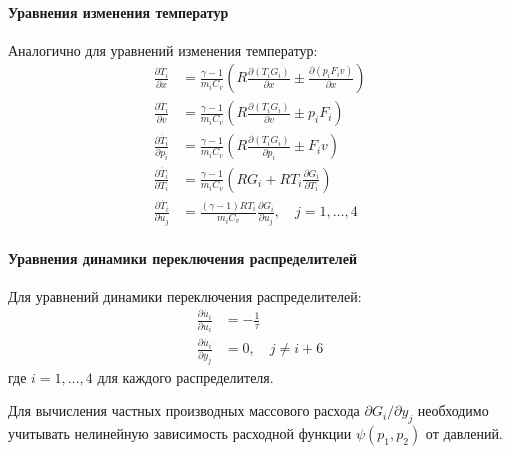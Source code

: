 \paragraph{Уравнения изменения температур}
Аналогично для уравнений изменения температур:
\begin{equation}\label{eq:ch2/jacobian_temperature}
    \begin{aligned}
        \frac{\partial \dot{T_i}}{\partial x}   & = \frac{\gamma-1}{m_iC_v}\left(R\frac{\partial (T_iG_i)}{\partial x} \pm \frac{\partial (p_iF_iv)}{\partial x}\right) \\
        \frac{\partial \dot{T_i}}{\partial v}   & = \frac{\gamma-1}{m_iC_v}\left(R\frac{\partial (T_iG_i)}{\partial v} \pm p_iF_i\right)                                \\
        \frac{\partial \dot{T_i}}{\partial p_i} & = \frac{\gamma-1}{m_iC_v}\left(R\frac{\partial (T_iG_i)}{\partial p_i} \pm F_iv\right)                                \\
        \frac{\partial \dot{T_i}}{\partial T_i} & = \frac{\gamma-1}{m_iC_v}\left(RG_i + RT_i\frac{\partial G_i}{\partial T_i}\right)                                    \\
        \frac{\partial \dot{T_i}}{\partial u_j} & = \frac{(\gamma-1)RT_i}{m_iC_v}\frac{\partial G_i}{\partial u_j}, \quad j = 1, \ldots, 4
    \end{aligned}
\end{equation}

\paragraph{Уравнения динамики переключения распределителей}
Для уравнений динамики переключения распределителей:
\begin{equation}\label{eq:ch2/jacobian_valves}
    \begin{aligned}
        \frac{\partial \dot{u_i}}{\partial u_i} & = -\frac{1}{\tau}     \\
        \frac{\partial \dot{u_i}}{\partial y_j} & = 0, \quad j \neq i+6
    \end{aligned}
\end{equation}
где $i = 1, \ldots, 4$ для каждого распределителя.

Для вычисления частных производных массового расхода $\partial G_i/\partial y_j$ необходимо учитывать нелинейную
зависимость расходной функции $\psi(p_1, p_2)$ от давлений.

